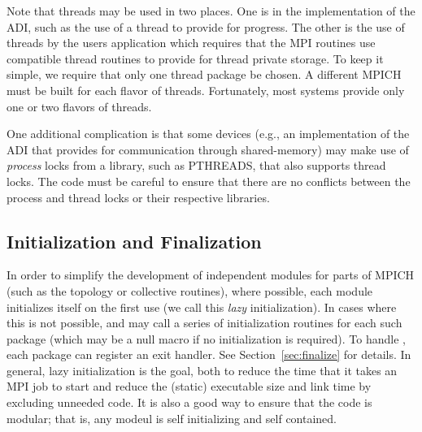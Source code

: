 \documentclass{article}
\begin{document}
Note that threads may be used in two places.  One is in the
implementation of the ADI, such as the use of a thread to provide for
progress.  The other is the use of threads by the users application
which requires that the MPI routines use compatible thread routines to
provide for thread private storage.  To keep it simple, we require
that only one thread package be chosen.  A different MPICH must be
built for each flavor of threads.  Fortunately, most systems provide
only one or two flavors of threads.

One additional complication is that some devices (e.g., an
implementation of the ADI that provides for communication through
shared-memory) may make use of \emph{process} locks from a library,
such as PTHREADS, that also supports thread locks.  The code must be
careful to ensure that there are no conflicts between the process and
thread locks or their respective libraries.

\subsection{Initialization and Finalization}
\label{sec:initialization}
In order to simplify the development of independent modules for parts
of MPICH (such as the topology or collective routines),  where
possible, each module initializes itself on the first use (we call
this \emph{lazy} initialization).  In cases
where this is not possible, 
 and  may call a series of
initialization routines for each such package (which may be a null
macro if no initialization is required).  To handle
, each package can register an exit handler.  See
Section~\ref{sec:finalize} for details.
In general, lazy initialization is the goal, both to reduce the time
that it takes an MPI job to start and reduce the (static) executable
size and link time by excluding unneeded code.  It is also a good way
to ensure that the code is modular; that is, any modeul is self
initializing and self contained.

\end{document}
